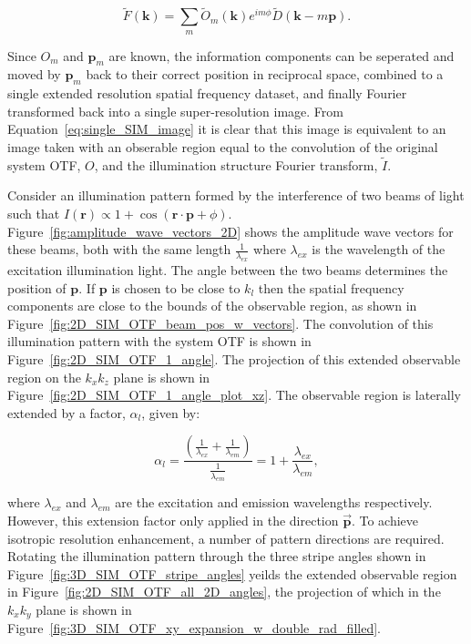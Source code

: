 \begin{equation}\label{eq:single_SIM_image_simple}
\tilde{F}(\textbf{k}) = \sum\limits_{m}{\tilde{O}_{m}(\textbf{k})e^{im\phi}\tilde{D}\left(\textbf{k} - m\textbf{p}\right)}.
\end{equation}

Since $O_{m}$ and $\textbf{p}_{m}$ are known, the information components
can be seperated and moved by $\textbf{p}_{m}$ back to their correct 
position in reciprocal space, combined to a single extended resolution
spatial frequency dataset, and finally Fourier transformed back into a 
single super-resolution image.  From Equation~\ref{eq:single_SIM_image} 
it is clear that this image is equivalent to an image taken with an 
obserable region equal to the convolution of the original system OTF, 
$O$, and the illumination structure Fourier transform, $\tilde{I}$. 

Consider an illumination pattern formed by the interference of two beams 
of light such that $I(\textbf{r}) \propto 1 + \cos(\textbf{r}\cdot
\textbf{p} + \phi)$. Figure~\ref{fig:amplitude_wave_vectors_2D} shows 
the amplitude wave vectors for these beams, both with the same length 
$\frac{1}{\lambda_{ex}}$ where $\lambda_{ex}$ is the wavelength of the 
excitation illumination light. The angle between the two beams determines 
the position of $\textbf{p}$. If $\textbf{p}$ is chosen to be close to 
$k_{l}$ then the spatial frequency components are close to the bounds 
of the observable region, as shown in 
Figure~\ref{fig:2D_SIM_OTF_beam_pos_w_vectors}. The convolution of this 
illumination pattern with the system OTF is shown in 
Figure~\ref{fig:2D_SIM_OTF_1_angle}. The projection of this extended 
observable region on the $k_{x}k_{z}$ plane is shown in 
Figure~\ref{fig:2D_SIM_OTF_1_angle_plot_xz}. The observable region
is laterally extended by a factor, $\alpha_{l}$, given by:

\begin{equation}\label{eq:lateral_res_extension_factor}
	\alpha_{l} = \frac{\left(\frac{1}{\lambda_{ex}} + \frac{1}{\lambda_{em}}\right)}{\frac{1}{\lambda_{em}}} = 1 + \frac{\lambda_{ex}}{\lambda_{em}},
\end{equation}

where $\lambda_{ex}$ and $\lambda_{em}$ are the excitation and emission
wavelengths respectively.  However, this extension factor only applied in 
the direction $\overrightarrow{\textbf{p}}$. To achieve isotropic 
resolution enhancement, a number of pattern directions are required. 
Rotating the illumination pattern through the three stripe angles shown 
in Figure~\ref{fig:3D_SIM_OTF_stripe_angles} yeilds the extended 
observable region in Figure~\ref{fig:2D_SIM_OTF_all_2D_angles}, the 
projection of which in the $k_{x}k_{y}$ plane is shown in
Figure~\ref{fig:3D_SIM_OTF_xy_expansion_w_double_rad_filled}. 


